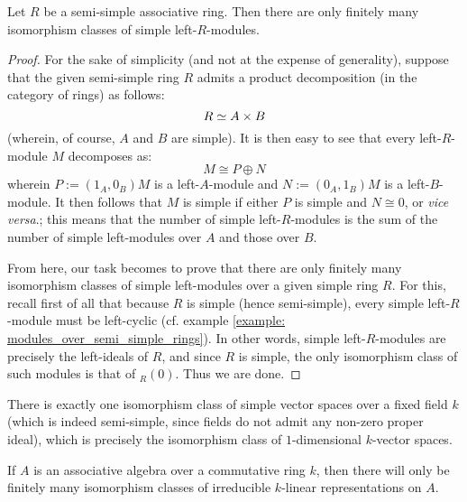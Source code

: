             \begin{lemma} \label{lemma: simple_modules_over_semi_simple_rings}
                Let $R$ be a semi-simple associative ring. Then there are only finitely many isomorphism classes of simple left-$R$-modules. 
            \end{lemma}
                \begin{proof}
                    For the sake of simplicity (and not at the expense of generality), suppose that the given semi-simple ring $R$ admits a product decomposition (in the category of rings) as follows:
                        $$R \cong A \x B$$
                    (wherein, of course, $A$ and $B$ are simple). It is then easy to see that every left-$R$-module $M$ decomposes as:
                        $$M \cong P \oplus N$$
                    wherein $P := (1_A, 0_B)M$ is a left-$A$-module and $N := (0_A, 1_B)M$ is a left-$B$-module. It then follows that $M$ is simple if either $P$ is simple and $N \cong 0$, or \textit{vice versa}.; this means that the number of simple left-$R$-modules is the sum of the number of simple left-modules over $A$ and those over $B$.
                    
                    From here, our task becomes to prove that there are only finitely many isomorphism classes of simple left-modules over a given simple ring $R$. For this, recall first of all that because $R$ is simple (hence semi-simple), every simple left-$R$-module must be left-cyclic (cf. example \ref{example: modules_over_semi_simple_rings}). In other words, simple left-$R$-modules are precisely the left-ideals of $R$, and since $R$ is simple, the only isomorphism class of such modules is that of ${}_R(0)$. Thus we are done. 
                \end{proof}
            \begin{example}
                There is exactly one isomorphism class of simple vector spaces over a fixed field $k$ (which is indeed semi-simple, since fields do not admit any non-zero proper ideal), which is precisely the isomorphism class of $1$-dimensional $k$-vector spaces. 
            \end{example}
            \begin{example}
                If $A$ is an associative algebra over a commutative ring $k$, then there will only be finitely many isomorphism classes of irreducible $k$-linear representations on $A$. 
            \end{example}
